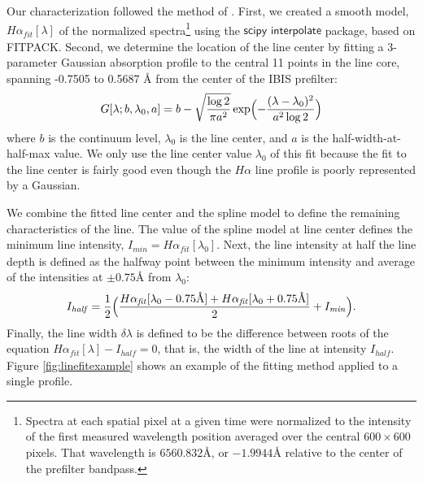 \documentclass[twocolumn]{aastex62}
\newcommand{\figref}[1]{Figure \ref{#1}}
\newcommand{\code}[1]{\ensuremath{\textsf{#1}}}
\newcommand{\scipy}{\code{scipy}}
\newcommand{\fnc}[1]{\code{#1}}
\newcommand{\halpha}{\ensuremath{H\alpha}}
\newcommand{\hfit}{\ensuremath{\halpha_\mathit{fit} }}
\newcommand{\linecenter}{\ensuremath{\lambda_0}}
\newcommand{\linew}{\ensuremath{\delta \lambda}}
\newcommand{\imin}{\ensuremath{I_\mathit{min}}}
\newcommand{\ihalf}{\ensuremath{I_\mathit{half}}}
\begin{document}
Our characterization followed the method of \citet{2009Cauzzi}.
First, we created a smooth model, $\hfit[\lambda]$ of the normalized spectra\footnote{Spectra at each spatial pixel at a given time were normalized to the intensity of the first measured wavelength position averaged over the central $600\times600$ pixels.  That wavelength is $6560.832$\AA{}, or $-1.9944$\AA{} relative to the center of the prefilter bandpass.} using the \scipy{} \fnc{interpolate} package, based on FITPACK.  
Second, we determine the location of the line center by fitting a 3-parameter Gaussian absorption profile to the central 11 points in the line core, spanning -0.7505 to 0.5687 \AA{} from the center of the IBIS prefilter:
\begin{equation}
    G[\lambda; b, \linecenter, a] = b- \sqrt{\frac{\log2}{\pi a^2}}\exp\Bigl(-\frac{(\lambda - \linecenter)^2}{a^2\log2}\Bigr)
\end{equation}
where $b$ is the continuum level, $\linecenter$ is the line center, and $a$ is the half-width-at-half-max value.  
We only use the line center value $\lambda_0$ of this fit because the fit to the line center is fairly good even though the \halpha{} line profile is poorly represented by a Gaussian.  \par

We combine the fitted line center and the spline model to define the remaining characteristics of the line.  
The value of the spline model at line center defines the minimum line intensity, $\imin{}=\hfit[\linecenter{}]$.  
Next, the line intensity at half the line depth is defined as the halfway point between the minimum intensity and average of the intensities at $\pm0.75$\AA{} from \linecenter{}: 
\begin{equation}
    \ihalf = \frac{1}{2}\Bigl(\frac{\hfit[\linecenter-0.75\text{\AA{}}]+\hfit[\linecenter+0.75\text{\AA{}}]}{2}+\imin \Bigr).
\end{equation}
Finally, the line width \linew{} is defined to be the difference between roots of the equation \mbox{$\hfit[\lambda]-\ihalf = 0$}, that is, the width of the line at intensity \ihalf.
\figref{fig:linefitexample} shows an example of the fitting method applied to a single profile.\par
\end{document}
